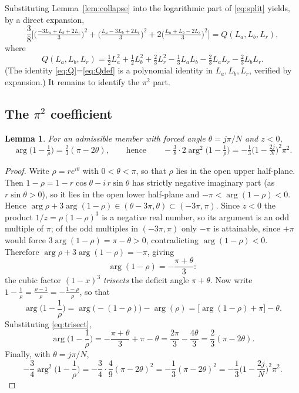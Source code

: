 \documentclass[11pt]{article}
\newtheorem{lemma}[theorem]{Lemma}
\theoremstyle{definition}
\begin{document}
Substituting Lemma~\ref{lem:collapse} into the logarithmic part of \eqref{eq:split} yields, by a
direct expansion,
\begin{equation}\label{eq:Q}
  \frac38\Big[\big(\tfrac{-3L_a+L_b+2L_r}{3}\big)^2+\big(\tfrac{L_a-3L_b+2L_r}{3}\big)^2
  +2\big(\tfrac{L_a+L_b-2L_r}{3}\big)^2\Big]
  = Q(L_a,L_b,L_r),
\end{equation}
where
\begin{equation}\label{eq:Qdef}
  Q(L_a,L_b,L_r)=\tfrac12L_a^2+\tfrac12L_b^2+\tfrac23L_r^2
  -\tfrac13L_aL_b-\tfrac23L_aL_r-\tfrac23L_bL_r .
\end{equation}
(The identity \eqref{eq:Q}=\eqref{eq:Qdef} is a polynomial identity in $L_a,L_b,L_r$, verified by
expansion.) It remains to identify the $\pi^2$ part.

\subsection{The $\pi^2$ coefficient}

\begin{lemma}\label{lem:angle}
For an admissible member with forced angle $\theta=j\pi/N$ and $z<0$,
\[
  \arg\!\big(1-\tfrac1\rho\big)=\tfrac23(\pi-2\theta),
  \qquad\text{hence}\qquad
  -\tfrac38\cdot 2\arg^2\!\big(1-\tfrac1\rho\big)=-\tfrac13\Big(1-\tfrac{2j}{N}\Big)^2\pi^2 .
\]
\end{lemma}

\begin{proof}
Write $\rho=re^{i\theta}$ with $0<\theta<\pi$, so that $\rho$ lies in the open upper half-plane. Then
$1-\rho=1-r\cos\theta-i\,r\sin\theta$ has strictly negative imaginary part (as $r\sin\theta>0$), so it
lies in the open lower half-plane and $-\pi<\arg(1-\rho)<0$. Hence
$\arg\rho+3\arg(1-\rho)\in(\theta-3\pi,\theta)\subset(-3\pi,\pi)$. Since $z<0$ the product
$1/z=\rho(1-\rho)^3$ is a negative real number, so its argument is an odd multiple of $\pi$; of the
odd multiples in $(-3\pi,\pi)$ only $-\pi$ is attainable, since $+\pi$ would force
$3\arg(1-\rho)=\pi-\theta>0$, contradicting $\arg(1-\rho)<0$. Therefore
$\arg\rho+3\arg(1-\rho)=-\pi$, giving
\begin{equation}\label{eq:trisect}
  \arg(1-\rho)=-\frac{\pi+\theta}{3}:
\end{equation}
the cubic factor $(1-x)^3$ \emph{trisects} the deficit angle $\pi+\theta$. Now write
$1-\tfrac1\rho=\tfrac{\rho-1}{\rho}=-\tfrac{1-\rho}{\rho}$, so that
\[
  \arg\!\Big(1-\frac1\rho\Big)
  =\arg\!\big(-(1-\rho)\big)-\arg(\rho)
  =\big[\arg(1-\rho)+\pi\big]-\theta .
\]
Substituting \eqref{eq:trisect},
\[
  \arg\!\Big(1-\frac1\rho\Big)
  =-\frac{\pi+\theta}{3}+\pi-\theta
  =\frac{2\pi}{3}-\frac{4\theta}{3}
  =\frac23(\pi-2\theta).
\]
Finally, with $\theta=j\pi/N$,
\[
  -\frac34\arg^2\!\Big(1-\frac1\rho\Big)
  =-\frac34\cdot\frac49(\pi-2\theta)^2
  =-\frac13(\pi-2\theta)^2
  =-\frac13\Big(1-\frac{2j}{N}\Big)^2\pi^2 .
\]
\qedhere
\end{proof}
\end{document}
